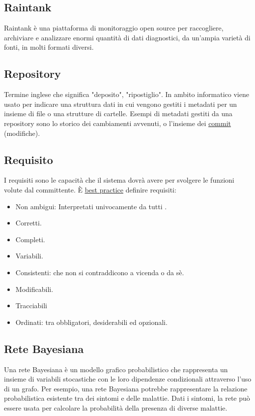 		
	\newpage


	\subsection{Raintank}
	\label{sec:raintank}
	Raintank è una piattaforma di monitoraggio open source per raccogliere, archiviare e analizzare enormi quantità di dati diagnostici, da un'ampia varietà di fonti, in molti formati diversi.


	\subsection{Repository}
	\label{sec:repo}
	Termine inglese che significa "deposito", "ripostiglio". In ambito informatico viene usato per indicare una struttura dati in cui vengono gestiti i metadati per un insieme di file o una strutture di cartelle. Esempi di metadati gestiti da una repository sono lo storico dei cambiamenti avvenuti, o l'insieme dei \underline{\hyperref[sec:commit]{commit}} (modifiche).


	\subsection{Requisito}
	\label{sec:requisito}
	I requisiti sono le capacità che il sistema dovrà avere per svolgere le funzioni volute dal committente. È \underline{\hyperref[sec:bestpractice]{best practice}} definire requisiti:
	\begin{itemize}
	\item Non ambigui: Interpretati univocamente da tutti .
	\item Corretti.
	\item Completi.
	\item Variabili.
	\item Consistenti: che non si contraddicono a vicenda o da sè.
	\item Modificabili.
	\item Tracciabili
	\item Ordinati: tra obbligatori, desiderabili ed opzionali.
	\end{itemize}


	\subsection{Rete Bayesiana}
	\label{sec:retebayes}
	Una rete Bayesiana è un modello grafico probabilistico che rappresenta un insieme di variabili stocastiche con le loro dipendenze condizionali attraverso l'uso di un grafo. Per esempio, una rete Bayesiana potrebbe rappresentare la relazione probabilistica esistente tra dei sintomi e delle malattie. Dati i sintomi, la rete può essere usata per calcolare la probabilità della presenza di diverse malattie.

